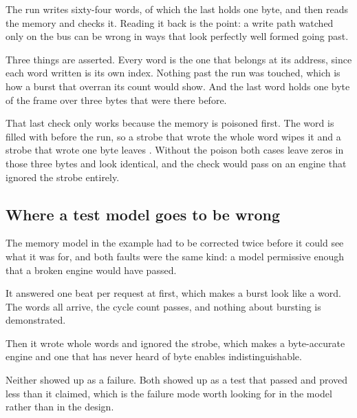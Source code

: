 The run writes sixty-four words, of which the last holds one byte,
and then reads the memory and checks it. Reading it back is the
point: a write path watched only on the bus can be wrong in ways that
look perfectly well formed going past.

Three things are asserted. Every word is the one that belongs at its
address, since each word written is its own index. Nothing past the
run was touched, which is how a burst that overran its count would
show. And the last word holds one byte of the frame over three bytes
that were there before.

That last check only works because the memory is poisoned first. The
word is filled with  before the run, so a strobe
that wrote the whole word wipes it and a strobe that wrote one byte
leaves . Without the poison both cases leave zeros
in those three bytes and look identical, and the check would pass on
an engine that ignored the strobe entirely.

\subsection{Where a test model goes to be wrong}

The memory model in the example had to be corrected twice before it
could see what it was for, and both faults were the same kind: a
model permissive enough that a broken engine would have passed.

It answered one beat per request at first, which makes a burst look
like a word. The words all arrive, the cycle count passes, and
nothing about bursting is demonstrated.

Then it wrote whole words and ignored the strobe, which makes a
byte-accurate engine and one that has never heard of byte enables
indistinguishable.

Neither showed up as a failure. Both showed up as a test that passed
and proved less than it claimed, which is the failure mode worth
looking for in the model rather than in the design.


